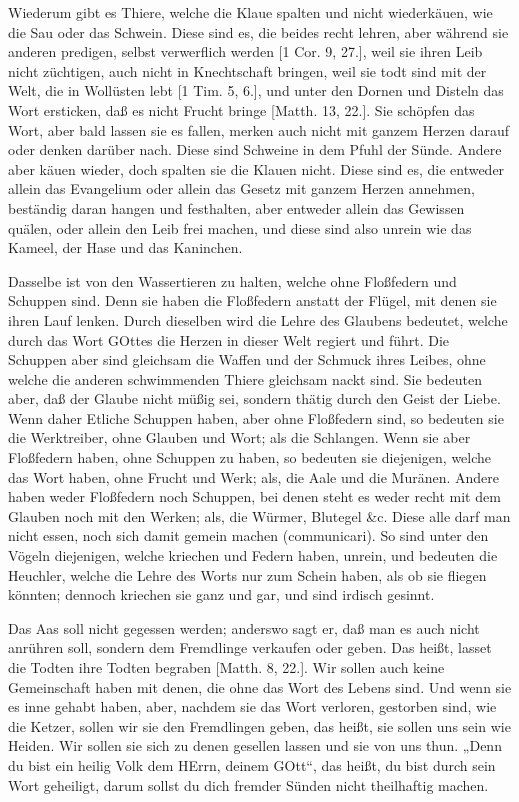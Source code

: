 Wiederum gibt es Thiere, welche die Klaue spalten und nicht wiederkäuen, wie die Sau oder das Schwein. Diese sind es, die beides recht lehren, aber während sie anderen predigen, selbst verwerflich werden [1 Cor. 9, 27.], weil sie ihren Leib nicht züchtigen, auch nicht in Knechtschaft bringen, weil sie todt sind mit der Welt, die in Wollüsten lebt [1 Tim. 5, 6.], und unter den Dornen und Disteln das Wort ersticken, daß es nicht Frucht bringe [Matth. 13, 22.]. Sie schöpfen das Wort, aber bald lassen sie es fallen, merken auch nicht mit ganzem Herzen darauf oder denken darüber nach. Diese sind Schweine in dem Pfuhl der Sünde. Andere aber käuen wieder, doch spalten sie die Klauen nicht. Diese sind es, die entweder allein das Evangelium oder allein das Gesetz mit ganzem Herzen annehmen, beständig daran hangen und festhalten, aber entweder allein das Gewissen quälen, oder allein den Leib frei machen, und diese sind also unrein wie das Kameel, der Hase und das Kaninchen.

Dasselbe ist von den Wassertieren zu halten, welche ohne Floßfedern und Schuppen sind. Denn sie haben die Floßfedern anstatt der Flügel, mit denen sie ihren Lauf lenken. Durch dieselben wird die Lehre des Glaubens bedeutet, welche durch das Wort GOttes die Herzen in dieser Welt regiert und führt. Die Schuppen aber sind gleichsam die Waffen und der Schmuck ihres Leibes, ohne welche die anderen schwimmenden Thiere gleichsam nackt sind. Sie bedeuten aber, daß der Glaube nicht müßig sei, sondern thätig durch den Geist der Liebe. Wenn daher Etliche Schuppen haben, aber ohne Floßfedern sind, so bedeuten sie die Werktreiber, ohne Glauben und Wort; als die Schlangen. Wenn sie aber Floßfedern haben, ohne Schuppen zu haben, so bedeuten sie diejenigen, welche das Wort haben, ohne Frucht und Werk; als, die Aale und die Muränen. Andere haben weder Floßfedern noch Schuppen, bei denen steht es weder recht mit dem Glauben noch mit den Werken; als, die Würmer, Blutegel \&c. Diese alle darf man nicht essen, noch sich damit gemein machen (communicari). So sind unter den Vögeln diejenigen, welche kriechen und Federn haben, unrein, und bedeuten die Heuchler, welche die Lehre des Worts nur zum Schein haben, als ob sie fliegen könnten; dennoch kriechen sie ganz und gar, und sind irdisch gesinnt.

Das Aas soll nicht gegessen werden; anderswo sagt er, daß man es auch nicht anrühren soll, sondern dem Fremdlinge verkaufen oder geben. Das heißt, lasset die Todten ihre Todten begraben [Matth. 8, 22.]. Wir sollen auch keine Gemeinschaft haben mit denen, die ohne das Wort des Lebens sind. Und wenn sie es inne gehabt haben, aber, nachdem sie das Wort verloren, gestorben sind, wie die Ketzer, sollen wir sie den Fremdlingen geben, das heißt, sie sollen uns sein wie Heiden. Wir sollen sie sich zu denen gesellen lassen und sie von uns thun. „Denn du bist ein heilig Volk dem HErrn, deinem GOtt“, das heißt, du bist durch sein Wort geheiligt, darum sollst du dich fremder Sünden nicht theilhaftig machen.

